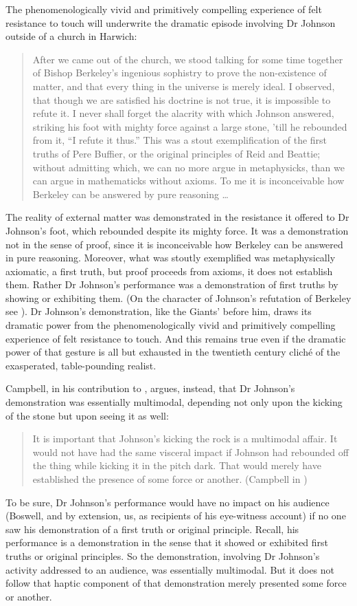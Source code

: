 The phenomenologically vivid and primitively compelling experience of felt resistance to touch will underwrite the dramatic episode involving Dr Johnson outside of a church in Harwich:
\begin{quote}
	After we came out of the church, we stood talking for some time together of Bishop Berkeley’s ingenious sophistry to prove the non-existence of matter, and that every thing in the universe is merely ideal. I observed, that though we are satisfied his doctrine is not true, it is impossible to refute it. I never shall forget the alacrity with which Johnson answered, striking his foot with mighty force against a large stone, ’till he rebounded from it, ``I refute it thus.'' This was a stout exemplification of the first truths of Pere Buffier, or the original principles of Reid and Beattie; without admitting which, we can no more argue in metaphysicks, than we can argue in mathematicks without axioms. To me it is inconceivable how Berkeley can be answered by pure reasoning \ldots\ \citep[\textsc{i} 471]{Boswell:1935fk}
\end{quote}
The reality of external matter was demonstrated in the resistance it offered to Dr Johnson’s foot, which rebounded despite its mighty force. It was a demonstration not in the sense of proof, since it is inconceivable how Berkeley can be answered in pure reasoning. Moreover, what was stoutly exemplified was metaphysically axiomatic, a first truth, but proof proceeds from axioms, it does not establish them. Rather Dr Johnson’s performance was a demonstration of first truths by showing or exhibiting them. (On the character of Johnson’s refutation of Berkeley see \citealt{Patey:1986uq}). Dr Johnson's demonstration, like the Giants' before him, draws its dramatic power from the phenomenologically vivid and primitively compelling experience of felt resistance to touch. And this remains true even if the dramatic power of that gesture is all but exhausted in the twentieth century clich\'{e} of the exasperated, table-pounding realist.

Campbell, in his contribution to \citet[71]{Campbell:2014aa}, argues, instead, that Dr Johnson's demonstration was essentially multimodal, depending not only upon the kicking of the stone but upon seeing it as well:
\begin{quote}
	It is important that Johnson's kicking the rock is a multimodal affair. It would not have had the same visceral impact if Johnson had rebounded off the thing while kicking it in the pitch dark. That would merely have established the presence of some force or another. (Campbell in \citealt[71]{Campbell:2014aa})
\end{quote}
To be sure, Dr Johnson's performance would have no impact on his audience (Bos\-well, and by extension, us, as recipients of his eye-witness account) if no one saw his demonstration of a first truth or original principle. Recall, his performance is a demonstration in the sense that it showed or exhibited first truths or original principles. So the demonstration, involving Dr Johnson's activity addressed to an audience, was essentially multimodal. But it does not follow that haptic component of that demonstration merely presented some force or another. 

